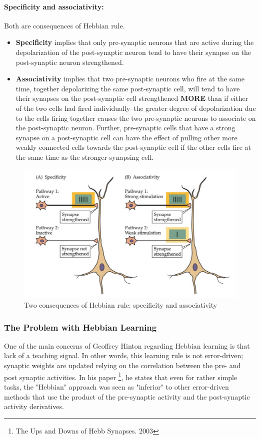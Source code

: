 \documentclass[main]{subfiles}
\begin{document}
\paragraph{Specificity and associativity:} Both are consequences of Hebbian rule.
\begin{itemize}
    \item \textbf{Specificity} implies that only pre-synaptic neurons that are active during the depolarization of the post-synaptic neuron tend to have their synapse on the post-synaptic neuron strengthened.
    \item \textbf{Associativity} implies that two pre-synaptic neurons who fire at the same time, together depolarizing the same post-synaptic cell, will tend to have their synapses on the post-synaptic cell strengthened \textbf{MORE} than if either of the two cells had fired individually--the greater degree of depolarization due to the cells firing together causes the two pre-synaptic neurons to associate on the post-synaptic neuron. Further, pre-synaptic cells that have a strong synapse on a post-synaptic cell can have the effect of pulling other more weakly connected cells towards the post-synaptic cell if the other cells fire at the same time as the stronger-synapsing cell.
\end{itemize}
\begin{figure}[H]
    \centering
    \includegraphics[width=.8\textwidth]{03_PlasticityInTheBrain/figures/specificity_associativity.png}
    \caption{Two consequences of Hebbian rule: specificity and associativity}
    \label{fig:specificity_associativity}
\end{figure}


\subsubsection{The Problem with Hebbian Learning}
One of the main concerns of Geoffrey Hinton regarding Hebbian learning is that lack of a teaching signal. In other words, this learning rule is not error-driven; synaptic weights are updated relying on the correlation between the pre- and post synaptic activities. In his paper \footnote{The Ups and Downs of Hebb Synapses. 2003}, he states that even for rather simple tasks, the "Hebbian" approach was seen as "inferior" to other error-driven methods that use the product of the pre-synaptic activity and the post-synaptic activity derivatives.\\
\end{document}
